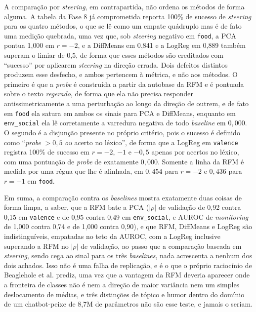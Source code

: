 A comparação por \textit{steering}, em contrapartida, não ordena os métodos de forma alguma. A
tabela da Fase 8 já comprometida reporta 100\% de sucesso de \textit{steering} para os quatro
métodos, o que se lê como um empate quádruplo mas é de fato uma medição quebrada, uma vez
que, sob \textit{steering} negativo em \verb|food|, a PCA pontua 1{,}000 em $r = -2$, e a
DiffMeans em 0{,}841 e a LogReg em 0{,}889 também superam o limiar de 0{,}5, de forma que esses
métodos são creditados com ``sucesso'' por aplicarem \textit{steering} na direção errada. Dois defeitos
distintos produzem esse desfecho, e ambos pertencem à métrica, e não aos métodos. O
primeiro é que a \textit{probe} é construída a partir da autobase da RFM e é pontuada sobre
o texto \emph{regerado}, de forma que ela não precisa responder antissimetricamente a uma
perturbação ao longo da direção de outrem, e de fato em \verb|food| ela satura em ambos os
sinais para PCA e DiffMeans, enquanto em \verb|env_social| ela lê corretamente a varredura
negativa de todo \textit{baseline} em $0{,}000$. O segundo é a disjunção presente no próprio
critério, pois o sucesso é definido como ``\textit{probe} $>0{,}5$ \emph{ou} acerto no
léxico'', de forma que a LogReg em \verb|valence| registra 100\% de sucesso em $r = -2$,
$-1$ e $-0{,}5$ apenas por acertos no léxico, com uma pontuação de \textit{probe} de
exatamente $0{,}000$. Somente a linha da RFM é medida por uma régua que lhe é alinhada, em
$0{,}454$ para $r = -2$ e $0{,}436$ para $r = -1$ em \verb|food|.

Em suma, a comparação contra os \textit{baselines} mostra exatamente duas coisas de forma
limpa, a saber, que a RFM bate a PCA ($|\rho|$ de validação de 0{,}92 contra 0{,}15 em
\verb|valence| e de 0{,}95 contra 0{,}49 em \verb|env_social|, e AUROC de \textit{monitoring} de
1{,}000 contra 0{,}74 e de 1{,}000 contra 0{,}90), e que RFM, DiffMeans e LogReg são
indistinguíveis, empatadas no teto da AUROC, com a LogReg inclusive superando a RFM no
$|\rho|$ de validação, ao passo que a comparação baseada em \textit{steering}, sendo cega ao
sinal para os três \textit{baselines}, nada acrescenta a nenhum dos dois achados. Isso não
é uma falha de replicação, e é o que o próprio raciocínio de Beaglehole et al. prediz, uma
vez que a vantagem da RFM deveria aparecer onde a fronteira de classes não é nem a direção
de maior variância nem um simples deslocamento de médias, e três distinções de tópico e
humor dentro do domínio de um chatbot-peixe de 8{,}7M de parâmetros não são esse teste, e
jamais o seriam.

